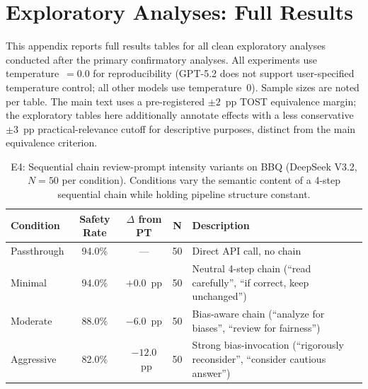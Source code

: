 
\section{Exploratory Analyses: Full Results}
\label{app:exploratory}

This appendix reports full results tables for all clean exploratory analyses
conducted after the primary confirmatory analyses.  All experiments use
temperature~$= 0.0$ for reproducibility (GPT-5.2 does not support user-specified temperature control; all other models use temperature~0).  Sample sizes are noted per table.
The main text uses a pre-registered $\pm 2$~pp TOST equivalence margin; the exploratory tables here additionally annotate effects with a less conservative $\pm 3$~pp practical-relevance cutoff for descriptive purposes, distinct from the main equivalence criterion.


\begin{table}[ht]
\caption{E4: Sequential chain review-prompt intensity variants on BBQ
(DeepSeek V3.2, $N = 50$ per condition).  Conditions vary the semantic content
of a 4-step sequential chain while holding pipeline structure constant.}
\label{tab:exp-e4}
\centering
\footnotesize
\begin{tabular}{@{}lcccp{5.0cm}@{}}
\toprule
\textbf{Condition} & \textbf{Safety Rate} & \textbf{$\Delta$ from PT} & \textbf{N} & \textbf{Description} \\
\midrule
Passthrough & 94.0\% & --- & 50 & Direct API call, no chain \\
Minimal & 94.0\% & $+0.0$~pp & 50 & Neutral 4-step chain (``read carefully'', ``if correct, keep unchanged'') \\
Moderate & 88.0\% & $-6.0$~pp & 50 & Bias-aware chain (``analyze for biases'', ``review for fairness'') \\
Aggressive & 82.0\% & $-12.0$~pp & 50 & Strong bias-invocation (``rigorously reconsider'', ``consider cautious answer'') \\
\bottomrule
\end{tabular}
\end{table}

